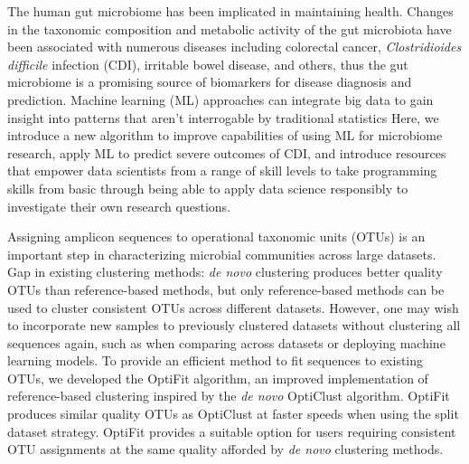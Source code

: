 The human gut microbiome has been implicated in maintaining health.
Changes in the taxonomic composition and metabolic activity of the gut
microbiota have been associated with numerous diseases including colorectal
cancer, \textit{Clostridioides difficile} infection (CDI), irritable bowel disease,
and others,
thus the gut microbiome is a promising source of biomarkers for disease
diagnosis and prediction.
Machine learning (ML) approaches can integrate big data to gain insight into
patterns that aren't interrogable by traditional statistics
Here, we introduce a new algorithm to improve capabilities of using ML for
microbiome research,
apply ML to predict severe outcomes of CDI,
and introduce resources that empower data scientists from a range of skill
levels to take programming skills from basic through being able to apply data
science responsibly to investigate their own research questions.

Assigning amplicon sequences to operational taxonomic units (OTUs) is an
important step in characterizing microbial communities across large
datasets.
Gap in existing clustering methods: \textit{de novo} clustering produces better
quality OTUs than reference-based methods, but only reference-based methods can
be used to cluster consistent OTUs across different datasets.
However,
one may wish to incorporate new samples to previously clustered datasets
without clustering all sequences again, such as when comparing across
datasets or deploying machine learning models.
To provide an efficient method to fit sequences to existing OTUs, we
developed the OptiFit algorithm, an improved implementation
of reference-based clustering inspired by the \textit{de novo} OptiClust
algorithm.
OptiFit produces similar quality OTUs as
OptiClust at faster speeds when using the split dataset strategy.
OptiFit provides a suitable option for users requiring consistent OTU
assignments at the same quality afforded by \textit{de novo} clustering
methods.

